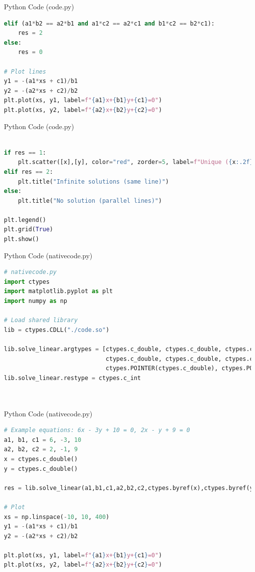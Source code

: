 \documentclass{beamer}
\begin{document}
\begin{frame}[fragile]{Python Code (code.py)}
\begin{lstlisting}[language=Python]
elif (a1*b2 == a2*b1 and a1*c2 == a2*c1 and b1*c2 == b2*c1):
    res = 2
else:
    res = 0

# Plot lines
y1 = -(a1*xs + c1)/b1
y2 = -(a2*xs + c2)/b2
plt.plot(xs, y1, label=f"{a1}x+{b1}y+{c1}=0")
plt.plot(xs, y2, label=f"{a2}x+{b2}y+{c2}=0")

\end{lstlisting}
\end{frame}


\begin{frame}[fragile]{Python Code (code.py)}
\begin{lstlisting}[language=Python]

if res == 1:
    plt.scatter([x],[y], color="red", zorder=5, label=f"Unique ({x:.2f},{y:.2f})")
elif res == 2:
    plt.title("Infinite solutions (same line)")
else:
    plt.title("No solution (parallel lines)")

plt.legend()
plt.grid(True)
plt.show()
\end{lstlisting}
\end{frame}
\begin{frame}[fragile]{Python Code (nativecode.py)}
\begin{lstlisting}[language=Python]
# nativecode.py
import ctypes
import matplotlib.pyplot as plt
import numpy as np

# Load shared library
lib = ctypes.CDLL("./code.so")

lib.solve_linear.argtypes = [ctypes.c_double, ctypes.c_double, ctypes.c_double,
                             ctypes.c_double, ctypes.c_double, ctypes.c_double,
                             ctypes.POINTER(ctypes.c_double), ctypes.POINTER(ctypes.c_double)]
lib.solve_linear.restype = ctypes.c_int




\end{lstlisting}
\end{frame}
\begin{frame}[fragile]{Python Code (nativecode.py)}
\begin{lstlisting}[language=Python]
# Example equations: 6x - 3y + 10 = 0, 2x - y + 9 = 0
a1, b1, c1 = 6, -3, 10
a2, b2, c2 = 2, -1, 9
x = ctypes.c_double()
y = ctypes.c_double()

res = lib.solve_linear(a1,b1,c1,a2,b2,c2,ctypes.byref(x),ctypes.byref(y))

# Plot
xs = np.linspace(-10, 10, 400)
y1 = -(a1*xs + c1)/b1
y2 = -(a2*xs + c2)/b2

plt.plot(xs, y1, label=f"{a1}x+{b1}y+{c1}=0")
plt.plot(xs, y2, label=f"{a2}x+{b2}y+{c2}=0")



\end{lstlisting}
\end{frame}
\end{document}
